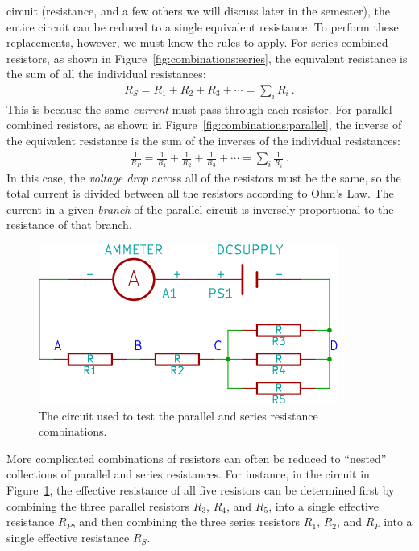 \documentclass[12pt]{article}
\begin{document}
circuit (resistance, and a few others we will discuss later in the
semester), the entire circuit can be reduced to a single equivalent
resistance.  To perform these replacements, however, we must know the
rules to apply.  For series combined resistors, as shown in
Figure~\ref{fig:combinations:series}, the equivalent resistance is the
sum of all the individual resistances:
\begin{gather*}
  R_S = R_1 + R_2 + R_3 + \cdots = \sum_i R_i\ .
\end{gather*}
This is because the same \textit{current} must pass through each
resistor.  For parallel combined resistors, as shown in
Figure~\ref{fig:combinations:parallel}, the inverse of the equivalent
resistance is the sum of the inverses of the individual resistances:
\begin{gather*}
  \frac{1}{R_P } = \frac{1}{R_1} + \frac{1}{R_2} + \frac{1}{R_3} +
  \cdots = \sum_i \frac{1}{R_i}\ .
\end{gather*}
In this case, the \textit{voltage drop} across all of the resistors
must be the same, so the total current is divided between all the
resistors according to Ohm's Law.  The current in a given
\textit{branch} of the parallel circuit is inversely proportional to
the resistance of that branch.

\begin{figure}
  \centering
  \includegraphics[width=2\textwidth/3]{figures/circuit}
  \caption{The circuit used to test the parallel and series resistance
    combinations.} 
  \label{fig:circuit}
\end{figure}
More complicated combinations of resistors can often be reduced to
``nested'' collections of parallel and series resistances.  For
instance, in the circuit in Figure~\ref{fig:circuit}, the effective
resistance of all five resistors can be determined first by combining
the three parallel resistors $R_3$, $R_4$, and $R_5$, into a single
effective resistance $R_P$, and then combining the three series
resistors $R_1$, $R_2$, and $R_P$ into a single effective resistance
$R_S$.
\end{document}
